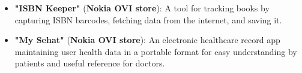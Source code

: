 \documentclass[10pt,a4paper,ragged2e,withhyper]{altacv}
\begin{document}

\divider


\begin{itemize}
  \item \textbf{"ISBN Keeper"} (\textbf{Nokia OVI store}): A tool for tracking books by capturing ISBN barcodes, fetching data from the internet, and saving it.
  \item \textbf{"My Sehat"} (\textbf{Nokia OVI store}): An electronic healthcare record app maintaining user health data in a portable format for easy understanding by patients and useful reference for doctors.
\end{itemize}

\divider

\end{document}
